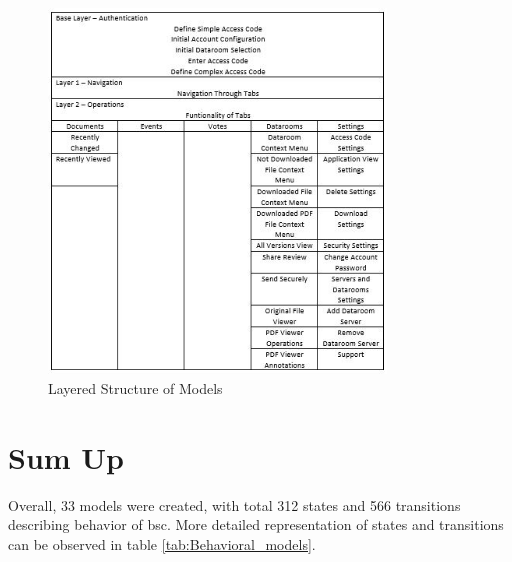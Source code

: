 \begin{figure} [htbp!]
	\centering
					\includegraphics[width=0.8\textwidth]{figures/Layers}
					\caption{\label{Fig:Layers} Layered Structure of Models}
\end{figure}

\section{Sum Up}
\par
Overall, 33 models were created, with total 312 states and 566 transitions describing behavior of \acrshort{bsc}. More detailed representation of states and transitions can be observed in table \ref{tab:Behavioral_models}.


